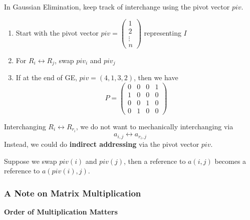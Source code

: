 
In Gaussian Elimination, keep track of interchange using the pivot vector \( piv \).

\begin{enumerate}
    \item Start with the pivot vector \( piv = \begin{pmatrix}
              1 \\ 2 \\ \vdots \\ n
          \end{pmatrix} \) representing \( I \)

    \item For \( R_i \leftrightarrow R_j \), swap \( piv_i \) and \( piv_j \)

    \item If at the end of GE, \( piv = (4, 1, 3, 2) \), then we have \[
              P = \begin{pmatrix}
                  0 & 0 & 0 & 1 \\
                  1 & 0 & 0 & 0 \\
                  0 & 0 & 1 & 0 \\
                  0 & 1 & 0 & 0
              \end{pmatrix}
          \]
\end{enumerate}

\begin{note}
    Interchanging \( R_i \leftrightarrow R_{r_i} \), we do not want to mechanically interchanging via \[
        a_{i, j} \leftrightarrow a_{r_i, j}
    \] Instead, we could do \textbf{indirect addressing} via the pivot vector \( piv \).

    Suppose we swap \( piv(i) \) and \( piv(j) \), then a reference to \( a(i, j) \) becomes a reference to \( a(piv(i), j) \).
\end{note}

\subsubsection{A Note on Matrix Multiplication}

\textbf{Order of Multiplication Matters}

